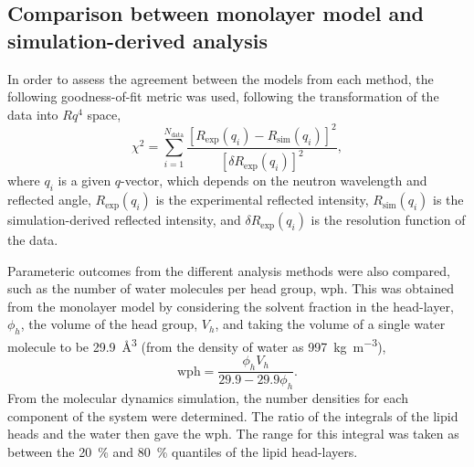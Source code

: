 \documentclass[amsmath,amssymb,twocolumn,superscriptaddress]{revtex4-1}
\begin{document}
\subsection{Comparison between monolayer model and simulation-derived analysis}
\label{sec:para}
In order to assess the agreement between the models from each method, the
following goodness-of-fit metric was used, following the transformation of
the data into $Rq^4$ space,
%
\begin{equation}
  \chi^2 = \sum_{i=1}^{N_{\text{data}}} \frac{[R_{\text{exp}}(q_i) -
  R_{\text{sim}}(q_i)]^2}{[\delta R_{\text{exp}}(q_i)]^2},
\end{equation}
%
where $q_i$ is a given $q$-vector, which depends on the neutron wavelength
and reflected angle, $R_{\text{exp}}(q_i)$ is the experimental reflected
intensity, $R_{\text{sim}}(q_i)$ is the simulation-derived reflected
intensity, and $\delta R_{\text{exp}}(q_i)$ is the resolution function of
the data.

Parameteric outcomes from the different analysis methods were also compared,
such as the number of water molecules per head group, wph.
This was obtained from the monolayer model by considering the solvent
fraction in the head-layer, $\phi_h$, the volume of the head group, $V_h$,
and taking the volume of a single water molecule to be
\SI{29.9}{\cubic\angstrom} (from the density of water as
\SI{997}{\kilo\gram\per\cubic\meter}),
%
\begin{equation}
  \text{wph} = \frac{\phi_hV_h}{29.9 - 29.9\phi_h}.
  \label{equ:wph}
\end{equation}
%
From the molecular dynamics simulation, the number densities for each
component of the system were determined.
The ratio of the integrals of the lipid heads and the water then gave the
wph.
The range for this integral was taken as between the \SI{20}{\percent} and
\SI{80}{\percent} quantiles of the lipid head-layers.
\end{document}
